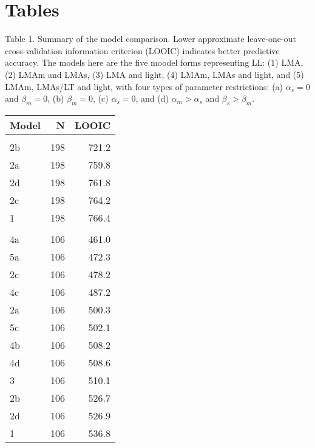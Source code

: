 \documentclass[
  12pt,
  a4paper,
,tablecaptionabove
]{scrartcl}
\begin{document}
\newpage

\hypertarget{tables}{%
\section{Tables}\label{tables}}

Table 1. Summary of the model comparison. Lower approximate
leave-one-out cross-validation information criterion (LOOIC) indicates
better predictive accuracy. The models here are the five moodel forms
representing LL: (1) LMA, (2) LMAm and LMAs, (3) LMA and light, (4)
LMAm, LMAs and light, and (5) LMAm, LMAs/LT and light, with four types
of parameter restrictions: (a) \(\alpha_s = 0\) and \(\beta_m = 0\), (b)
\(\beta_m = 0\), (c) \(\alpha_s = 0\), and (d) \(\alpha_m > \alpha_s\)
and \(\beta_s > \beta_m\).

\begin{table}
\centering
\begin{tabular}{lrr}
\toprule
Model & N & LOOIC\\
\midrule
\addlinespace[0.3em]
\multicolumn{3}{l}{\textbf{GLOPNET}}\\
\hspace{1em}2b & 198 & 721.2\\
\hspace{1em}2a & 198 & 759.8\\
\hspace{1em}2d & 198 & 761.8\\
\hspace{1em}2c & 198 & 764.2\\
\hspace{1em}1 & 198 & 766.4\\
\addlinespace[0.3em]
\multicolumn{3}{l}{\textbf{Panama}}\\
\hspace{1em}4a & 106 & 461.0\\
\hspace{1em}5a & 106 & 472.3\\
\hspace{1em}2c & 106 & 478.2\\
\hspace{1em}4c & 106 & 487.2\\
\hspace{1em}2a & 106 & 500.3\\
\hspace{1em}5c & 106 & 502.1\\
\hspace{1em}4b & 106 & 508.2\\
\hspace{1em}4d & 106 & 508.6\\
\hspace{1em}3 & 106 & 510.1\\
\hspace{1em}2b & 106 & 526.7\\
\hspace{1em}2d & 106 & 526.9\\
\hspace{1em}1 & 106 & 536.8\\
\bottomrule
\end{tabular}
\end{table}
\end{document}
